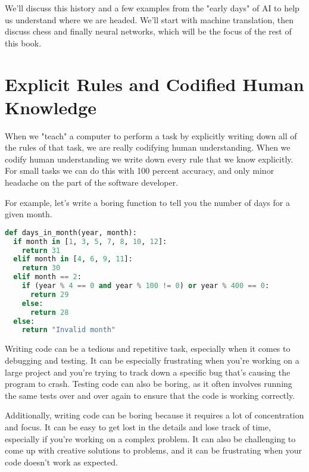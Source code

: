 We'll discuss this history and a few examples from the "early days" of AI to help us understand where we are headed. We'll start with machine translation, then discuss chess and finally neural networks, which will be the focus of the rest of this book.

\section{Explicit Rules and Codified Human Knowledge}

When we "teach" a computer to perform a task by explicitly writing down all of the rules of that task, we are really codifying human understanding. When we codify human understanding we write down every rule that we know explicitly. For small tasks we can do this with 100 percent accuracy, and only minor headache on the part of the software developer. 

For example, let's write a boring function to tell you the number of days for a given month. 

\begin{lstlisting}[language=Python,style=kaolstplain,linewidth=1.5\textwidth]
def days_in_month(year, month):
  if month in [1, 3, 5, 7, 8, 10, 12]:
    return 31
  elif month in [4, 6, 9, 11]:
    return 30
  elif month == 2:
    if (year % 4 == 0 and year % 100 != 0) or year % 400 == 0:
      return 29
    else:
      return 28
  else:
    return "Invalid month"

\end{lstlisting}


Writing code can be a tedious and repetitive task, especially when it comes to debugging and testing. It can be especially frustrating when you're working on a large project and you're trying to track down a specific bug that's causing the program to crash. Testing code can also be boring, as it often involves running the same tests over and over again to ensure that the code is working correctly.

Additionally, writing code can be boring because it requires a lot of concentration and focus. It can be easy to get lost in the details and lose track of time, especially if you're working on a complex problem. It can also be challenging to come up with creative solutions to problems, and it can be frustrating when your code doesn't work as expected.

